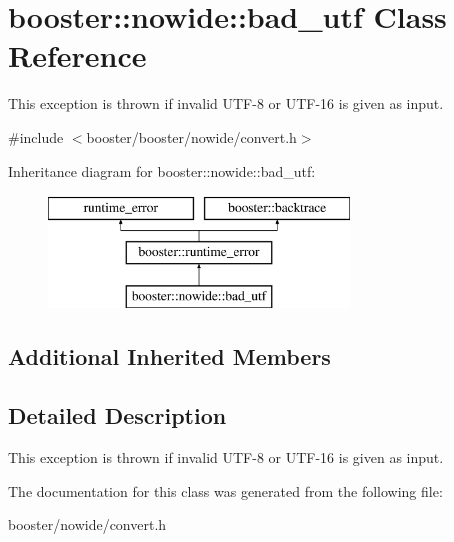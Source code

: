 \section{booster\+:\+:nowide\+:\+:bad\+\_\+utf Class Reference}
\label{classbooster_1_1nowide_1_1bad__utf}


This exception is thrown if invalid U\+T\+F-\/8 or U\+T\+F-\/16 is given as input.  




{\ttfamily \#include $<$booster/booster/nowide/convert.\+h$>$}

Inheritance diagram for booster\+:\+:nowide\+:\+:bad\+\_\+utf\+:\begin{figure}[H]
\begin{center}
\leavevmode
\includegraphics[height=3.000000cm]{classbooster_1_1nowide_1_1bad__utf}
\end{center}
\end{figure}
\subsection*{Additional Inherited Members}


\subsection{Detailed Description}
This exception is thrown if invalid U\+T\+F-\/8 or U\+T\+F-\/16 is given as input. 

The documentation for this class was generated from the following file\+:\begin{DoxyCompactItemize}
\item 
booster/nowide/convert.\+h\end{DoxyCompactItemize}
